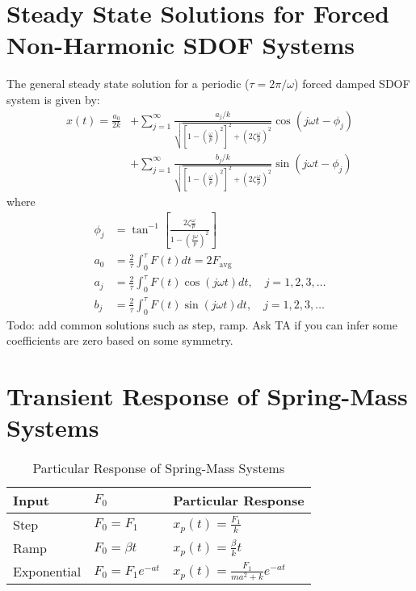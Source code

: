 \section{Steady State Solutions for Forced Non-Harmonic SDOF Systems}
The general steady state solution for a periodic ($\tau = 2\pi/\omega$) forced damped SDOF system is given by:
\begin{align*}
    x(t) = \frac{a_0}{2k} &+ \sum_{j = 1}^{\infty} \frac{a_j/k}{\sqrt{\left[1 - \left(\frac{\omega}{p}\right)^2\right]^2 + \left(2\zeta\frac{\omega}{p}\right)^2}}\cos(j\omega t - \phi_j) \\
    &+ \sum_{j = 1}^{\infty} \frac{b_j/k}{\sqrt{\left[1 - \left(\frac{\omega}{p}\right)^2\right]^2 + \left(2\zeta\frac{\omega}{p}\right)^2}}\sin(j\omega t - \phi_j)
\end{align*}
where
\begin{align*}
    \phi_j &= \tan^{-1} \left[\frac{2\zeta\frac{\omega}{p}}{1 - \left(\frac{j \omega}{p}\right)^2}\right]\\
    a_0 &= \frac{2}{\tau} \int_0^{\tau} F(t) dt = 2 F_{\text{avg}} \\
    a_j &= \frac{2}{\tau} \int_0^{\tau} F(t) \cos(j\omega t) dt, \quad j = 1, 2, 3, \ldots \\
    b_j &= \frac{2}{\tau} \int_0^{\tau} F(t) \sin(j\omega t) dt, \quad j = 1, 2, 3, \ldots
\end{align*}
Todo:
add common solutions such as step, ramp. Ask TA if you can infer some coefficients are zero based on some symmetry.

\section{Transient Response of Spring-Mass Systems}
\begin{table}[H]
    \centering
    \caption{Particular Response of Spring-Mass Systems}
    \begin{tabular}{lll}
        \toprule
        Input & $F_0$ & Particular Response \\
        \midrule
        Step & $F_0 = F_1$ & $\displaystyle x_p(t) = \frac{F_1}{k}$ \\[2ex]
        Ramp & $F_0 = \beta t$ & $\displaystyle x_p(t) = \frac{\beta}{k}t$ \\[2ex]
        Exponential & $F_0 = F_1 e^{-at}$ & $\displaystyle x_p(t) = \frac{F_1}{ma^2 + k} e^{-at}$ \\
        \bottomrule
        \end{tabular}
\end{table}




